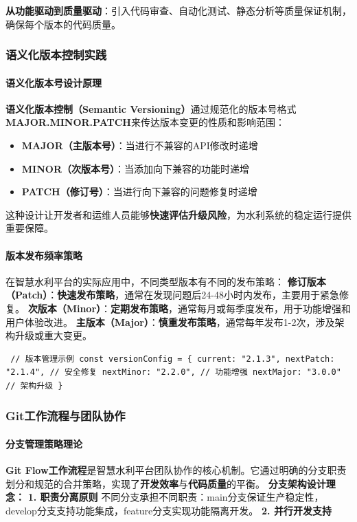 \textbf{从功能驱动到质量驱动}：引入代码审查、自动化测试、静态分析等质量保证机制，确保每个版本的代码质量。 \subsubsection{语义化版本控制实践}\label{ux8bedux4e49ux5316ux7248ux672cux63a7ux5236ux5b9eux8df5} \paragraph{语义化版本号设计原理}\label{ux8bedux4e49ux5316ux7248ux672cux53f7ux8bbeux8ba1ux539fux7406} \textbf{语义化版本控制（Semantic Versioning）}通过规范化的版本号格式\textbf{MAJOR.MINOR.PATCH}来传达版本变更的性质和影响范围： \begin{itemize} \item \textbf{MAJOR（主版本号）}：当进行不兼容的API修改时递增 \item \textbf{MINOR（次版本号）}：当添加向下兼容的功能时递增\\ \item \textbf{PATCH（修订号）}：当进行向下兼容的问题修复时递增 \end{itemize} 这种设计让开发者和运维人员能够\textbf{快速评估升级风险}，为水利系统的稳定运行提供重要保障。 \paragraph{版本发布频率策略}\label{ux7248ux672cux53d1ux5e03ux9891ux7387ux7b56ux7565} 在智慧水利平台的实际应用中，不同类型版本有不同的发布策略： \textbf{修订版本（Patch）}：\textbf{快速发布策略}，通常在发现问题后24-48小时内发布，主要用于紧急修复。 \textbf{次版本（Minor）}：\textbf{定期发布策略}，通常每月或每季度发布，用于功能增强和用户体验改进。 \textbf{主版本（Major）}：\textbf{慎重发布策略}，通常每年发布1-2次，涉及架构升级或重大变更。 \begin{verbatim} // 版本管理示例 const versionConfig = { current: "2.1.3", nextPatch: "2.1.4", // 安全修复 nextMinor: "2.2.0", // 功能增强 nextMajor: "3.0.0" // 架构升级 } \end{verbatim} \subsubsection{Git工作流程与团队协作}\label{gitux5de5ux4f5cux6d41ux7a0bux4e0eux56e2ux961fux534fux4f5c} \paragraph{分支管理策略理论}\label{ux5206ux652fux7ba1ux7406ux7b56ux7565ux7406ux8bba} \textbf{Git Flow工作流程}是智慧水利平台团队协作的核心机制。它通过明确的分支职责划分和规范的合并策略，实现了\textbf{开发效率}与\textbf{代码质量}的平衡。 \textbf{分支架构设计理念：} \textbf{1. 职责分离原则} 不同分支承担不同职责：main分支保证生产稳定性，develop分支支持功能集成，feature分支实现功能隔离开发。 \textbf{2. 并行开发支持} 